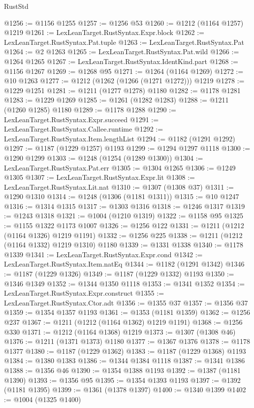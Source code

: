 \begin{lexlean}{RustStd}
\begin{coremodule}
@1256 := @1156 @1255
@1257 := @1256 @53
@1260 := @1212 (@1164 @1257) @1219
@1261 := LexLeanTarget.RustSyntax.Expr.block
@1262 := LexLeanTarget.RustSyntax.Pat.tuple
@1263 := LexLeanTarget.RustSyntax.Pat
@1264 := @2 @1263
@1265 := LexLeanTarget.RustSyntax.Pat.wild
@1266 := @1264 @1265
@1267 := LexLeanTarget.RustSyntax.IdentKind.part
@1268 := @1156 @1267
@1269 := @1268 @95
@1271 := @1264 (@1164 @1269)
@1272 := @10 @1263
@1277 := @1212 (@1262 (@1266 (@1271 @1272))) @1219
@1278 := @1229 @1251
@1281 := @1211 (@1277 @1278) @1180
@1282 := @1178 @1281
@1283 := @1229 @1269
@1285 := @1261 (@1282 @1283)
@1288 := @1211 (@1260 @1285) @1180
@1289 := @1178 @1288
@1290 := LexLeanTarget.RustSyntax.Expr.succeed
@1291 := LexLeanTarget.RustSyntax.Callee.runtime
@1292 := LexLeanTarget.RustSyntax.Item.lengthList
@1294 := @1182 (@1291 @1292)
@1297 := @1187 (@1229 @1257) @1193
@1299 := @1294 @1297 @1118
@1300 := @1290 @1299
@1303 := @1248 (@1254 (@1289 @1300))
@1304 := LexLeanTarget.RustSyntax.Pat.err
@1305 := @1304 @1265
@1306 := @1249 @1305
@1307 := LexLeanTarget.RustSyntax.Expr.lit
@1308 := LexLeanTarget.RustSyntax.Lit.nat
@1310 := @1307 (@1308 @37)
@1311 := @1290 @1310
@1314 := @1248 (@1306 (@1181 @1311))
@1315 := @10 @1247
@1316 := @1314 @1315
@1317 := @1303 @1316
@1318 := @1246 @1317
@1319 := @1243 @1318
@1321 := @1004 (@1210 @1319)
@1322 := @1158 @95
@1325 := @1155 @1322 @1173 @1007
@1326 := @1256 @122
@1331 := @1211 (@1212 (@1164 @1326) @1219 @1191)
@1332 := @1256 @225
@1338 := @1211 (@1212 (@1164 @1332) @1219 @1310) @1180
@1339 := @1331 @1338
@1340 := @1178 @1339
@1341 := LexLeanTarget.RustSyntax.Expr.cond
@1342 := LexLeanTarget.RustSyntax.Item.natEq
@1344 := @1182 (@1291 @1342)
@1346 := @1187 (@1229 @1326)
@1349 := @1187 (@1229 @1332) @1193
@1350 := @1346 @1349
@1352 := @1344 @1350 @1118
@1353 := @1341 @1352
@1354 := LexLeanTarget.RustSyntax.Expr.construct
@1355 := LexLeanTarget.RustSyntax.Ctor.adt
@1356 := @1355 @37
@1357 := @1356 @37
@1359 := @1354 @1357 @1193
@1361 := @1353 (@1181 @1359)
@1362 := @1256 @237
@1367 := @1211 (@1212 (@1164 @1362) @1219 @1191)
@1368 := @1256 @330
@1371 := @1212 (@1164 @1368) @1219
@1373 := @1307 (@1308 @46)
@1376 := @1211 (@1371 @1373) @1180
@1377 := @1367 @1376
@1378 := @1178 @1377
@1380 := @1187 (@1229 @1362)
@1383 := @1187 (@1229 @1368) @1193
@1384 := @1380 @1383
@1386 := @1344 @1384 @1118
@1387 := @1341 @1386
@1388 := @1356 @46
@1390 := @1354 @1388 @1193
@1392 := @1387 (@1181 @1390)
@1393 := @1356 @95
@1395 := @1354 @1393 @1193
@1397 := @1392 (@1181 @1395)
@1399 := @1361 (@1378 @1397)
@1400 := @1340 @1399
@1402 := @1004 (@1325 @1400)

\end{coremodule}
\end{lexlean}

